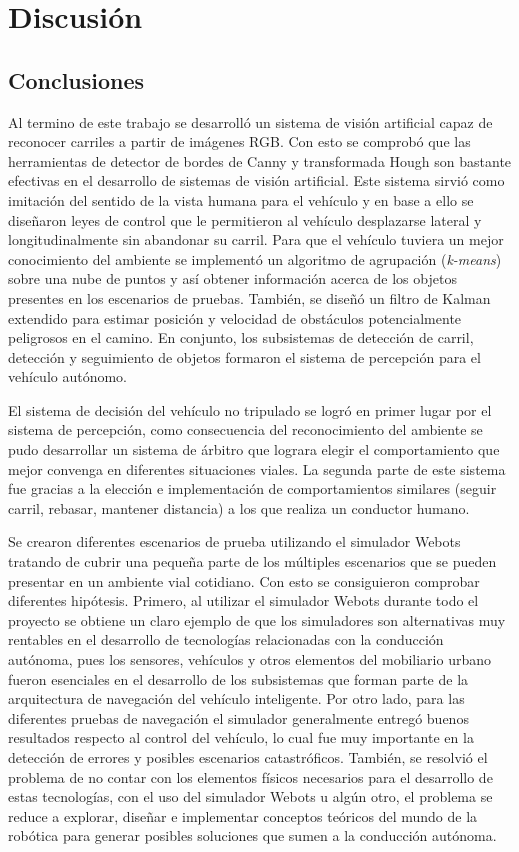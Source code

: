 \chapter{Discusión} \label{cap:discusión}
\section{Conclusiones} \label{sec:conclusiones}

Al termino de este trabajo se desarrolló un sistema de visión artificial capaz de reconocer carriles a partir de imágenes RGB. Con esto se comprobó que las herramientas de detector de bordes de Canny y transformada Hough son bastante efectivas en el desarrollo de sistemas de visión artificial. Este sistema sirvió como imitación del sentido de la vista humana para el vehículo y en base a ello se diseñaron leyes de control que le permitieron al vehículo desplazarse lateral y longitudinalmente sin abandonar su carril. Para que el vehículo tuviera un mejor conocimiento del ambiente se implementó un algoritmo de agrupación (\textit{k-means}) sobre una nube de puntos y así obtener información acerca de los objetos presentes en los escenarios de pruebas. También, se diseñó un filtro de Kalman extendido para estimar posición y velocidad de obstáculos potencialmente peligrosos en el camino. En conjunto, los subsistemas de detección de carril, detección y seguimiento de objetos formaron el sistema de percepción para el vehículo autónomo.

El sistema de decisión del vehículo no tripulado se logró en primer lugar por el sistema de percepción, como consecuencia del reconocimiento del ambiente se pudo desarrollar un sistema de árbitro que lograra elegir el comportamiento que mejor convenga en diferentes situaciones viales. La segunda parte de este sistema fue gracias a la elección e implementación de comportamientos similares (seguir carril, rebasar, mantener distancia) a los que realiza un conductor humano.

Se crearon diferentes escenarios de prueba utilizando el simulador Webots tratando de cubrir una pequeña parte de los múltiples escenarios que se pueden presentar en un ambiente vial cotidiano. Con esto se consiguieron comprobar diferentes hipótesis. Primero, al utilizar el simulador Webots durante todo el proyecto se obtiene un claro ejemplo de que los simuladores son alternativas muy rentables en el desarrollo de tecnologías relacionadas con la conducción autónoma, pues los sensores, vehículos y otros elementos del mobiliario urbano fueron esenciales en el desarrollo de los subsistemas que forman parte de la arquitectura de navegación del vehículo inteligente. Por otro lado, para las diferentes pruebas de navegación el simulador generalmente entregó buenos resultados respecto al control del vehículo, lo cual fue muy importante en la detección de errores y posibles escenarios catastróficos. También, se resolvió el problema de no contar con los elementos físicos necesarios para el desarrollo de estas tecnologías, con el uso del simulador Webots u algún otro, el problema se reduce a explorar, diseñar e implementar conceptos teóricos del mundo de la robótica para generar posibles soluciones que sumen a la conducción autónoma.

